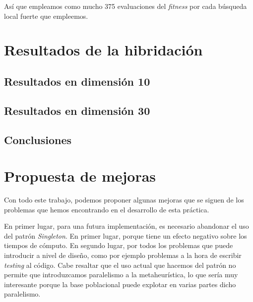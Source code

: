 \documentclass[11pt]{article}
\begin{document}
\begin{table}[H]
    \centering
    \caption{\emph{Parameter Tuning} para el máximo de evaluaciones por cada búsqueda local fuerte}
\end{table}

Así que empleamos como mucho 375 evaluaciones del \emph{fitness} por cada búsqueda local fuerte que empleemos.

\pagebreak
\section{Resultados de la hibridación}

\subsection{Resultados en dimensión 10}
\subsection{Resultados en dimensión 30}
\subsection{Conclusiones}

\pagebreak
\section{Propuesta de mejoras} \label{mejoras}

Con todo este trabajo, podemos proponer algunas mejoras que se siguen de los problemas que hemos encontrando en el desarrollo de esta práctica.

En primer lugar, para una futura implementación, es necesario abandonar el uso del patrón \emph{Singleton}. En primer lugar, porque tiene un efecto negativo sobre los tiempos de cómputo. En segundo lugar, por todos los problemas que puede introducir a nivel de diseño, como por ejemplo problemas a la hora de escribir \emph{testing} al código. Cabe resaltar que el uso actual que hacemos del patrón no permite que introduzcamos paralelismo a la metaheurística, lo que sería muy interesante porque la base poblacional puede explotar en varias partes dicho paralelismo.
\end{document}
